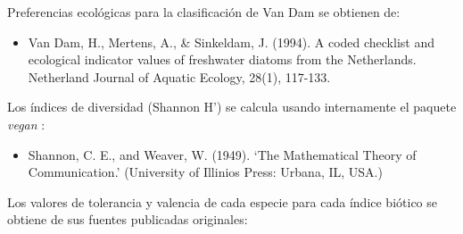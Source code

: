 \documentclass[
]{book}
\providecommand{\tightlist}{%
  \setlength{\itemsep}{0pt}\setlength{\parskip}{0pt}}
\begin{document}
Preferencias ecológicas para la clasificación de Van Dam se obtienen de:

\begin{itemize}
\tightlist
\item
  Van Dam, H., Mertens, A., \& Sinkeldam, J. (1994). A coded checklist and ecological indicator values of freshwater diatoms from the Netherlands. Netherland Journal of Aquatic Ecology, 28(1), 117-133.
\end{itemize}

Los índices de diversidad (Shannon H') se calcula usando internamente el paquete \emph{vegan} \citep{vegan}:

\begin{itemize}
\tightlist
\item
  Shannon, C. E., and Weaver, W. (1949). `The Mathematical Theory of Communication.' (University of Illinios Press: Urbana, IL, USA.)
\end{itemize}

Los valores de tolerancia y valencia de cada especie para cada índice biótico se obtiene de sus fuentes publicadas originales:
\end{document}
